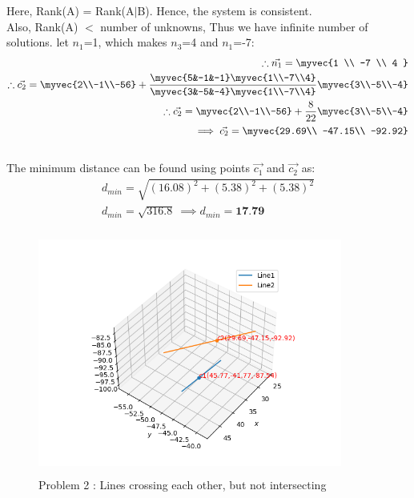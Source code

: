 \documentclass[journal,12pt,twocolumn]{IEEEtran}
\begin{document}
Here, Rank(A) = Rank(A$\mid$B). Hence, the system is consistent. 
\\
Also, Rank(A) $<$ number of unknowns, Thus we have infinite number of solutions. let $n_1$=1, which makes $n_3$=4 and $n_1$=-7:
\begin{align}
\therefore \vec{n_1}=\myvec{1 \\ -7 \\ 4 }\\
\therefore \vec{c_2}= \myvec{2\\-1\\-56}+\frac{\myvec{5&-1&-1} \myvec{1\\-7\\4}}{\myvec{3&-5&-4} \myvec{1\\-7\\4}}\myvec{3\\-5\\-4}\\
\therefore \vec{c_2}= \myvec{2\\-1\\-56}+\frac{8}{22}\myvec{3\\-5\\-4}\\
\implies \vec{c_2}=\myvec{29.69\\ -47.15\\ -92.92}
\end{align}
\\
The minimum distance can be found using points $\vec{c_1}$ and $\vec{c_2}$ as:
\begin{align}
    d_{min}=\sqrt{(16.08)^2+(5.38)^2+(5.38)^2}\\
    d_{min}=\sqrt{316.8} \ \implies d_{min}=\textbf{17.79} 
\end{align}
\newpage
\begin{figure}[h!]
\centering
\includegraphics[width=10cm, height=8cm]{Figure_2}
\caption{Problem 2 : Lines crossing each other, but not intersecting}
\label{Fig4}
\end{figure}
\end{document}
